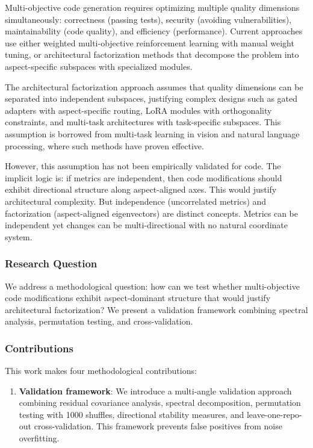 
Multi-objective code generation requires optimizing multiple quality dimensions simultaneously: correctness (passing tests), security (avoiding vulnerabilities), maintainability (code quality), and efficiency (performance). Current approaches use either weighted multi-objective reinforcement learning with manual weight tuning, or architectural factorization methods that decompose the problem into aspect-specific subspaces with specialized modules.

The architectural factorization approach assumes that quality dimensions can be separated into independent subspaces, justifying complex designs such as gated adapters with aspect-specific routing, LoRA modules with orthogonality constraints, and multi-task architectures with task-specific subspaces. This assumption is borrowed from multi-task learning in vision and natural language processing, where such methods have proven effective.

However, this assumption has not been empirically validated for code. The implicit logic is: if metrics are independent, then code modifications should exhibit directional structure along aspect-aligned axes. This would justify architectural complexity. But independence (uncorrelated metrics) and factorization (aspect-aligned eigenvectors) are distinct concepts. Metrics can be independent yet changes can be multi-directional with no natural coordinate system.

\subsubsection{Research Question}

We address a methodological question: how can we test whether multi-objective code modifications exhibit aspect-dominant structure that would justify architectural factorization? We present a validation framework combining spectral analysis, permutation testing, and cross-validation.

\subsubsection{Contributions}

This work makes four methodological contributions:

\begin{enumerate}
\item \textbf{Validation framework}: We introduce a multi-angle validation approach combining residual covariance analysis, spectral decomposition, permutation testing with 1000 shuffles, directional stability measures, and leave-one-repo-out cross-validation. This framework prevents false positives from noise overfitting.
\end{enumerate}


